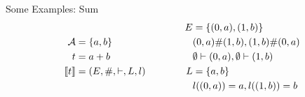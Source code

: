 \begin{frame}{Some Examples: Sum}
    \begin{equation*}
        \begin{aligned}
            \mathcal{A} & = \{a,b\}           \\
            t           & = a+b               \\
            \llbracket t \rrbracket     & = (E,\#,\vdash,L,l) \\
        \end{aligned}
        \qquad \qquad
        \begin{aligned}
            E & = \{(0,a),(1,b)\}                \\
              & (0,a) \# (1,b) , (1,b) \# (0,a)  \\
              & \emptyset \vdash (0,a), \emptyset \vdash (1,b) \\
            L & = \{a,b\}                        \\
              & l((0,a)) = a, l((1,b)) = b       \\
        \end{aligned}
    \end{equation*}
    \begin{align*}
    \end{align*}
    \begin{center}
    \end{center}
\end{frame}

